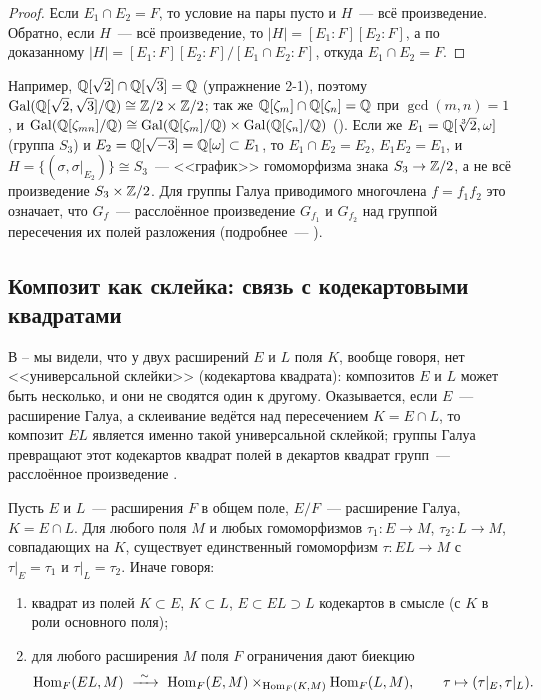 \begin{proof}
Если $E_1\cap E_2=F$, то условие на пары пусто и $H$~--- всё произведение. Обратно, если $H$~--- всё произведение, то
$|H|=[E_1:F][E_2:F]$, а по доказанному $|H|=[E_1:F][E_2:F]/[E_1\cap E_2:F]$, откуда $E_1\cap E_2=F$.
\end{proof}

Например, $\mathbb Q[\sqrt2]\cap\mathbb Q[\sqrt3]=\mathbb Q$ (упражнение 2-1), поэтому $\operatorname{Gal}(\mathbb Q[\sqrt2,\sqrt3]/\mathbb Q)\cong\mathbb Z/2\times\mathbb Z/2$; так же
$\mathbb Q[\zeta_m]\cap\mathbb Q[\zeta_n]=\mathbb Q$ при $\gcd(m,n)=1$, и $\operatorname{Gal}(\mathbb Q[\zeta_{mn}]/\mathbb Q)\cong\operatorname{Gal}(\mathbb Q[\zeta_m]/\mathbb Q)\times\operatorname{Gal}(\mathbb Q[\zeta_n]/\mathbb Q)$
(). Если же $E_1=\mathbb Q[\sqrt[3]2,\omega]$ (группа $S_3$) и $E_2=\mathbb Q[\sqrt{-3}]=\mathbb Q[\omega]\subset E_1$, то
$E_1\cap E_2=E_2$, $E_1E_2=E_1$, и $H=\{(\sigma,\sigma|_{E_2})\}\cong S_3$~--- <<график>> гомоморфизма знака
$S_3\to\mathbb Z/2$, а не всё произведение $S_3\times\mathbb Z/2$. Для группы Галуа приводимого многочлена $f=f_1f_2$ это означает, что
$G_f$~--- расслоённое произведение $G_{f_1}$ и $G_{f_2}$ над группой пересечения их полей разложения (подробнее~---
).

\subsection*{Композит как склейка: связь с кодекартовыми квадратами}

В -- мы видели, что у двух расширений $E$ и $L$ поля $K$, вообще говоря, нет <<универсальной склейки>>
(кодекартова квадрата): композитов $E$ и $L$ может быть несколько, и они не сводятся один к другому. Оказывается, если $E$~---
расширение Галуа, а склеивание ведётся над пересечением $K=E\cap L$, то композит $EL$ является именно такой
универсальной склейкой; группы Галуа превращают этот кодекартов квадрат полей в декартов квадрат групп~--- расслоённое
произведение .

\begin{proposition}
Пусть $E$ и $L$~--- расширения $F$ в общем поле, $E/F$~--- расширение Галуа, $K=E\cap L$. Для любого поля $M$ и любых
гомоморфизмов $\tau_1\colon E\to M$, $\tau_2\colon L\to M$, совпадающих на $K$, существует единственный гомоморфизм
$\tau\colon EL\to M$ с $\tau|_E=\tau_1$ и $\tau|_L=\tau_2$. Иначе говоря:
\begin{enumerate}[label=\textup{(\alph*)}]
\item квадрат из полей $K\subset E$, $K\subset L$, $E\subset EL\supset L$ кодекартов в смысле  (с $K$ в роли
основного поля);
\item для любого расширения $M$ поля $F$ ограничения дают биекцию
\[
\Hom_F(EL,M)\ \xrightarrow{\ \sim\ }\ \Hom_F(E,M)\times_{\Hom_F(K,M)}\Hom_F(L,M),\qquad \tau\mapsto(\tau|_E,\tau|_L).
\]
\end{enumerate}
\end{proposition}

